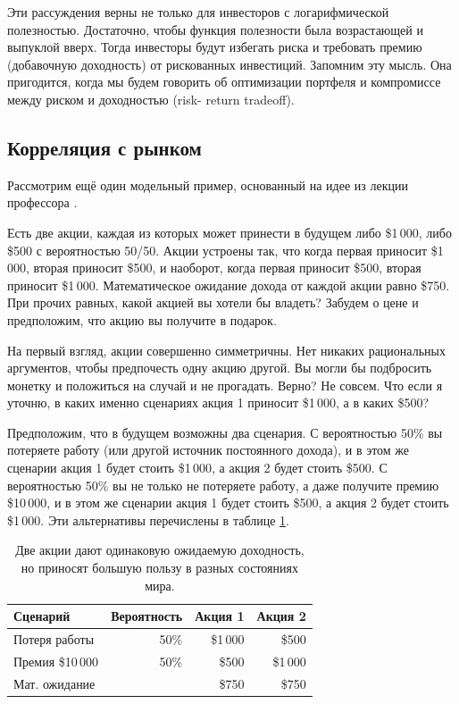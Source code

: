 Эти рассуждения верны не только для инвесторов с логарифмической полезностью. 
Достаточно, чтобы функция полезности была возрастающей и выпуклой вверх. Тогда 
инвесторы будут избегать риска и требовать премию (добавочную доходность) от 
рискованных инвестиций. Запомним эту мысль. Она пригодится, когда мы будем 
говорить об оптимизации портфеля и компромиссе между риском и доходностью (risk-
return tradeoff).

\subsection{Корреляция с рынком}

Рассмотрим ещё один модельный пример, основанный на идее из лекции профессора
 \cite{cochrane2013consumption}.

Есть две акции, каждая из которых может принести в будущем либо \$1\,000, либо 
\$500 с вероятностью 50/50. Акции устроены так, что когда первая приносит
\$1\,000, вторая приносит \$500, и наоборот, когда первая приносит \$500, вторая 
приносит \$1\,000. Математическое ожидание дохода от каждой акции равно \$750. 
При прочих равных, какой акцией вы хотели бы владеть? Забудем о цене и 
предположим, что акцию вы получите в подарок.

На первый взгляд, акции совершенно симметричны. Нет никаких рациональных 
аргументов, чтобы предпочесть одну акцию другой. Вы могли бы подбросить монетку 
и положиться на случай и не прогадать. Верно? Не совсем. Что если я уточню, в 
каких именно сценариях акция 1 приносит \$1\,000, а в каких \$500?

Предположим, что в будущем возможны два сценария. С вероятностью 50\% вы 
потеряете работу (или другой источник постоянного дохода), и в этом же сценарии 
акция 1 будет стоить \$1\,000, а акция 2 будет стоить \$500. С вероятностью 50\% 
вы не только не потеряете работу, а даже получите премию \$10\,000, и в этом же 
сценарии акция 1 будет стоить \$500, а акция 2 будет стоить \$1\,000. Эти 
альтернативы перечислены в таблице \ref{two_shares_states_of_nature}.

\begin{table}[h]
\centering
\begin{tabular}{l|r|r|r}
Сценарий                 & Вероятность & Акция 1 & Акция 2 \\  \hline
Потеря работы      & 50\%                 & \$1\,000 & \$500 \\
Премия \$10\,000 & 50\%                 & \$500      & \$1\,000 \\ \hline
\multicolumn{2}{l|}{Мат. ожидание} & \$750 & \$750 
\end{tabular}
\caption{Две акции дают одинаковую ожидаемую доходность, но приносят большую пользу в разных состояниях мира.}
\label{two_shares_states_of_nature}
\end{table}

